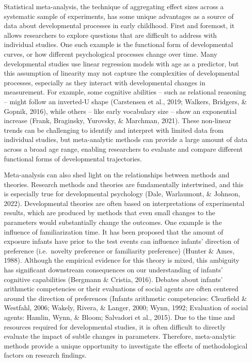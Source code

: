 \documentclass[10pt, letterpaper]{article}
\begin{document}
Statistical meta-analysis, the technique of aggregating effect sizes
across a systematic sample of experiments, has some unique advantages as
a source of data about developmental processes in early childhood. First
and foremost, it allows researchers to explore questions that are
difficult to address with individual studies. One such example is the
functional form of developmental curves, or how different psychological
processes change over time. Many developmental studies use linear
regression models with age as a predictor, but this assumption of
linearity may not capture the complexities of developmental processes,
especially as they interact with developmental changes in measurement.
For example, some cognitive abilities -- such as relational reasoning --
might follow an inverted-U shape (Carstensen et al., 2019; Walkers,
Bridgers, \& Gopnik, 2016), while others -- like early vocabulary size
-- show an exponential increase (Frank, Braginsky, Yurovsky, \&
Marchman, 2021). These non-linear trends can be challenging to identify
and interpret with limited data from individual studies, but
meta-analytic methods can provide a large amount of data across a broad
age range, enabling researchers to evaluate and compare different
functional forms of developmental trajectories.

Meta-analysis can also shed light on the relationships between methods
and theories. Research methods and theories are fundamentally
intertwined, and this is especially true for developmental psychology
(Dale, Warlaumont, \& Johnson, 2022). Developmental theories are often
based on interpretations of experimental results, which are produced by
methods that even small changes to the parameters would substantially
change the outcomes. One example is the influence of familiarization
time. It has been proposed that the amount of exposure infants have
prior to the test events can influence infants' direction of preference
(i.e.~novelty preference or familiarity preference) (Hunter \& Ames,
1988). Although the empirical evidence for this theory is mixed, this
ambiguity has significant downstream consequences on our understanding
of infants' cognitive capabilities (Bergmann \& Cristia, 2016). Debates
about infants' arithmetic competencies or their evaluations of social
agents are often centered around the direction of preferences (Infants
arithmetic competencies: Clearfield \& Westfahl, 2006; Wakely, Rivera,
\& Langer, 2000; Wynn, 1992; Evaluation of social agents: Hamlin, Wynn,
\& Bloom; Salvadori et al., 2015). Due to the time and resources
required for developmental studies, it is often difficult to directly
evaluate the impact of subtle changes in parameters. Therefore,
meta-analytic methods provide a unique opportunity to investigate the
effects of methodological factors on research findings.
\end{document}
